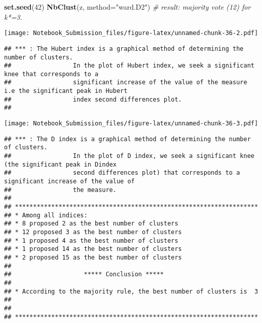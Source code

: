 \documentclass[
]{article}
\newenvironment{Shaded}{\begin{snugshade}}{\end{snugshade}}
\newcommand{\CommentTok}[1]{\textcolor[rgb]{0.56,0.35,0.01}{\textit{#1}}}
\newcommand{\DataTypeTok}[1]{\textcolor[rgb]{0.13,0.29,0.53}{#1}}
\newcommand{\DecValTok}[1]{\textcolor[rgb]{0.00,0.00,0.81}{#1}}
\newcommand{\KeywordTok}[1]{\textcolor[rgb]{0.13,0.29,0.53}{\textbf{#1}}}
\newcommand{\NormalTok}[1]{#1}
\newcommand{\StringTok}[1]{\textcolor[rgb]{0.31,0.60,0.02}{#1}}
\begin{document}
\begin{Shaded}
\begin{Highlighting}[]
\KeywordTok{set.seed}\NormalTok{(}\DecValTok{42}\NormalTok{)}
\KeywordTok{NbClust}\NormalTok{(z, }\DataTypeTok{method=}\StringTok{"ward.D2"}\NormalTok{) }\CommentTok{# result: majority vote (12) for k*=3.}
\end{Highlighting}
\end{Shaded}

\texttt{[image: Notebook\_Submission\_files/figure-latex/unnamed-chunk-36-2.pdf]}

\begin{verbatim}
## *** : The Hubert index is a graphical method of determining the number of clusters.
##                 In the plot of Hubert index, we seek a significant knee that corresponds to a 
##                 significant increase of the value of the measure i.e the significant peak in Hubert
##                 index second differences plot. 
## 
\end{verbatim}

\texttt{[image: Notebook\_Submission\_files/figure-latex/unnamed-chunk-36-3.pdf]}

\begin{verbatim}
## *** : The D index is a graphical method of determining the number of clusters. 
##                 In the plot of D index, we seek a significant knee (the significant peak in Dindex
##                 second differences plot) that corresponds to a significant increase of the value of
##                 the measure. 
##  
## ******************************************************************* 
## * Among all indices:                                                
## * 8 proposed 2 as the best number of clusters 
## * 12 proposed 3 as the best number of clusters 
## * 1 proposed 4 as the best number of clusters 
## * 1 proposed 14 as the best number of clusters 
## * 2 proposed 15 as the best number of clusters 
## 
##                    ***** Conclusion *****                            
##  
## * According to the majority rule, the best number of clusters is  3 
##  
##  
## *******************************************************************
\end{verbatim}
\end{document}
